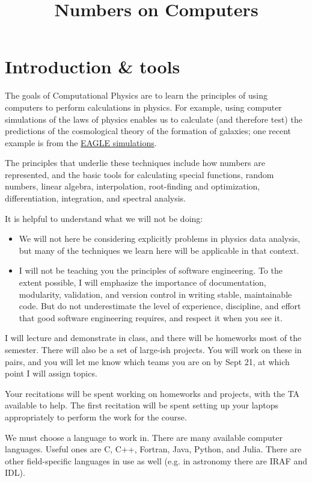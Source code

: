 \title{Numbers on Computers}

\section{Introduction \& tools}

The goals of Computational Physics are to learn the principles of
using computers to perform calculations in physics.  For example,
using computer simulations of the laws of physics enables us to
calculate (and therefore test) the predictions of the cosmological
theory of the formation of galaxies; one recent example is from the
\href{https://vimeo.com/93020014}{EAGLE simulations}.

The principles that underlie these techniques include how numbers are
represented, and the basic tools for calculating special functions,
random numbers, linear algebra, interpolation, root-finding and
optimization, differentiation, integration, and spectral analysis.

It is helpful to understand what we will not be doing:
\begin{itemize}
\item We will not here be considering explicitly problems in physics
  data analysis, but many of the techniques we learn here will be
  applicable in that context.
\item I will not be teaching you the principles of software
  engineering. To the extent possible, I will emphasize the importance
  of documentation, modularity, validation, and version control in
  writing stable, maintainable code. But do not underestimate the
  level of experience, discipline, and effort that good software
  engineering requires, and respect it when you see it.
\end{itemize}

I will lecture and demonstrate in class, and there will be homeworks
most of the semester. There will also be a set of large-ish
projects. You will work on these in pairs, and you will let me know
which teams you are on by Sept 21, at which point I will assign
topics.

Your recitations will be spent working on homeworks and projects, with
the TA available to help. The first recitation will be spent setting
up your laptops appropriately to perform the work for the course.

We must choose a language to work in. There are many available
computer languages. Useful ones are C, C++, Fortran, Java, Python, and
Julia. There are other field-specific languages in use as well
(e.g. in astronomy there are IRAF and IDL).

